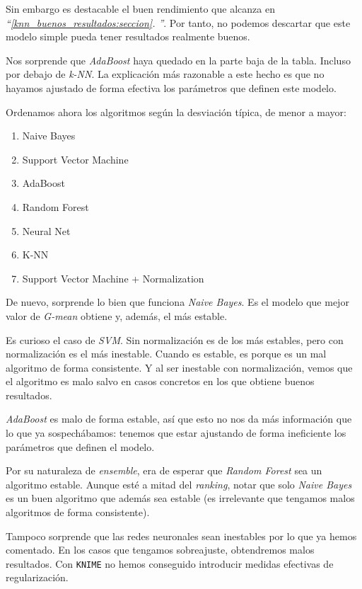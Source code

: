 \documentclass[11pt]{article}
\newcommand{\customcite}[1]{\emph{``\ref{#1}. \nameref{#1}''}}
\begin{document}
Sin embargo es destacable el buen rendimiento que alcanza en \customcite{knn_buenos_resultados:seccion}. Por tanto, no podemos descartar que este modelo simple pueda tener resultados realmente buenos.

Nos sorprende que \emph{AdaBoost} haya quedado en la parte baja de la tabla. Incluso por debajo de \emph{k-NN}. La explicación más razonable a este hecho es que no hayamos ajustado de forma efectiva los parámetros que definen este modelo.

Ordenamos ahora los algoritmos según la desviación típica, de menor a mayor:

\begin{enumerate}
    \item Naive Bayes
    \item Support Vector Machine
    \item AdaBoost
    \item Random Forest
    \item Neural Net
    \item K-NN
    \item Support Vector Machine + Normalization
\end{enumerate}

De nuevo, sorprende lo bien que funciona \emph{Naive Bayes}. Es el modelo que mejor valor de \emph{G-mean} obtiene y, además, el más estable.

Es curioso el caso de \emph{SVM}. Sin normalización es de los más estables, pero con normalización es el más inestable. Cuando es estable, es porque es un mal algoritmo de forma consistente. Y al ser inestable con normalización, vemos que el algoritmo es malo salvo en casos concretos en los que obtiene buenos resultados.

\emph{AdaBoost} es malo de forma estable, así que esto no nos da más información que lo que ya sospechábamos: tenemos que estar ajustando de forma ineficiente los parámetros que definen el modelo.

Por su naturaleza de \emph{ensemble}, era de esperar que \emph{Random Forest} sea un algoritmo estable. Aunque esté a mitad del \emph{ranking}, notar que solo \emph{Naive Bayes} es un buen algoritmo que además sea estable (es irrelevante que tengamos malos algoritmos de forma consistente).

Tampoco sorprende que las redes neuronales sean inestables por lo que ya hemos comentado. En los casos que tengamos sobreajuste, obtendremos malos resultados. Con \lstinline{KNIME} no hemos conseguido introducir medidas efectivas de regularización.
\end{document}
